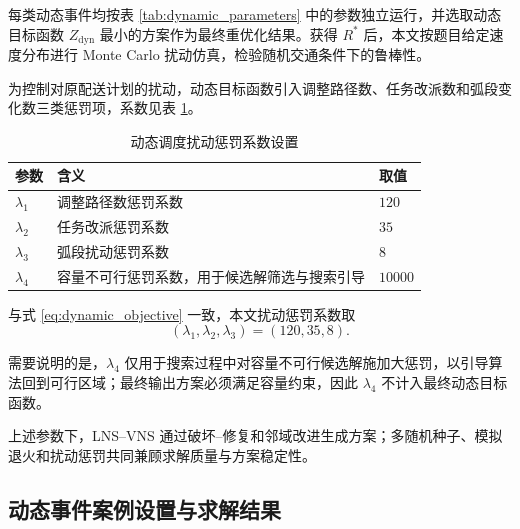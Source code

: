 \documentclass[withoutpreface,bwprint]{cumcmthesis} %
\begin{document}
每类动态事件均按表 \ref{tab:dynamic_parameters} 中的参数独立运行，并选取动态目标函数 $Z_{\mathrm{dyn}}$ 最小的方案作为最终重优化结果。获得 $R^{*}$ 后，本文按题目给定速度分布进行 Monte Carlo 扰动仿真，检验随机交通条件下的鲁棒性。


为控制对原配送计划的扰动，动态目标函数引入调整路径数、任务改派数和弧段变化数三类惩罚项，系数见表 \ref{tab:disturbance_parameters}。

\begin{table}[H]
\centering
\caption{动态调度扰动惩罚系数设置}
\label{tab:disturbance_parameters}
\small
\renewcommand{\arraystretch}{1.20}
\setlength{\tabcolsep}{4pt}

\begin{tabular}{
>{\centering\arraybackslash}p{2.2cm}
>{\raggedright\arraybackslash}p{9.2cm}
>{\centering\arraybackslash}p{3.0cm}}
\toprule
\rowcolor{tablehead}
\textbf{参数} & \centering\textbf{含义} & \textbf{取值} \\
\midrule

$\lambda_1$ 
& 调整路径数惩罚系数 
& $120$ \\

\rowcolor{tablerow}
$\lambda_2$ 
& 任务改派惩罚系数 
& $35$ \\

$\lambda_3$ 
& 弧段扰动惩罚系数 
& $8$ \\

\rowcolor{tablerow}
$\lambda_4$ 
& 容量不可行惩罚系数，用于候选解筛选与搜索引导 
& $10000$ \\

\bottomrule
\end{tabular}

\end{table}

与式 \eqref{eq:dynamic_objective} 一致，本文扰动惩罚系数取
\begin{equation}
(\lambda_1,\lambda_2,\lambda_3)=(120,35,8).
\end{equation}

需要说明的是，$\lambda_4$ 仅用于搜索过程中对容量不可行候选解施加大惩罚，以引导算法回到可行区域；最终输出方案必须满足容量约束，因此 $\lambda_4$ 不计入最终动态目标函数。

上述参数下，LNS--VNS 通过破坏--修复和邻域改进生成方案；多随机种子、模拟退火和扰动惩罚共同兼顾求解质量与方案稳定性。

\subsection{动态事件案例设置与求解结果}
\end{document}
